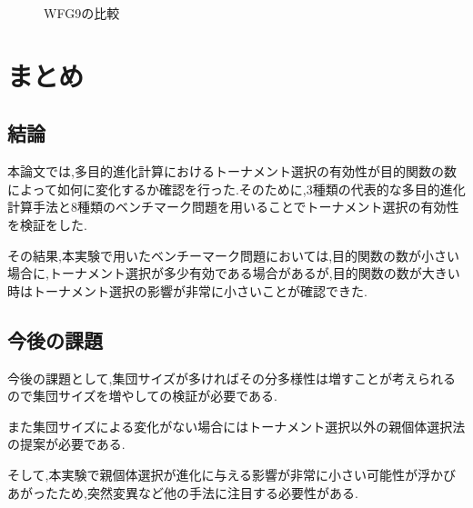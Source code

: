\documentclass[12pt,a4j,notitlepage]{jreport}
\begin{document}
\vspace{+2mm}
\begin{figure}[H]
\begin{center}
				\end{center}
				\setlength{\abovecaptionskip}{0mm}
\setlength{\belowcaptionskip}{0mm}
\vspace{-2mm}
			\caption{WFG9の比較}

	\end{figure}



\chapter{まとめ}
\section{結論}
本論文では,多目的進化計算におけるトーナメント選択の有効性が目的関数の数によって如何に変化するか確認を行った.そのために,3種類の代表的な多目的進化計算手法と8種類のベンチマーク問題を用いることでトーナメント選択の有効性を検証をした.

その結果,本実験で用いたベンチーマーク問題においては,目的関数の数が小さい場合に,トーナメント選択が多少有効である場合があるが,目的関数の数が大きい時はトーナメント選択の影響が非常に小さいことが確認できた.

\section{今後の課題}
今後の課題として,集団サイズが多ければその分多様性は増すことが考えられるので集団サイズを増やしての検証が必要である.

また集団サイズによる変化がない場合にはトーナメント選択以外の親個体選択法の提案が必要である.

そして,本実験で親個体選択が進化に与える影響が非常に小さい可能性が浮かびあがったため,突然変異など他の手法に注目する必要性がある.
\end{document}

